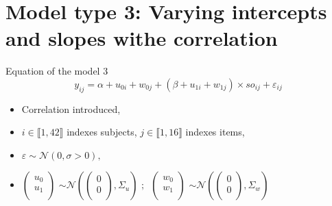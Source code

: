 \documentclass[unknownkeysallowed]{beamer}
\begin{document}
\section{Model type 3: Varying intercepts and slopes withe correlation}

\begin{frame}{Equation of the model 3}
{\[y_{ij}=\alpha + u_{0i} + w_{0j} + (\beta + u_{1i} + w_{1j})\times so_{ij}+\varepsilon_{ij}\]}

\medskip

 \begin{itemize}
        \item Correlation introduced,
        \item $i \in \llbracket1,42\rrbracket$ indexes subjects, $j \in \llbracket1,16\rrbracket$ indexes items,
        \item $\varepsilon \sim \mathcal{N}(0,\sigma>0),$
        \item $\begin{pmatrix}
        u_0 \\
        u_1 \\
        \end{pmatrix}$ $\sim \mathcal{N}\left(\begin{pmatrix}
        0 \\
        0 \\
        \end{pmatrix}, \Sigma_u\right) \text{ ; }$ $\begin{pmatrix}
        w_0 \\
        w_1 \\
        \end{pmatrix}$ $\sim \mathcal{N}\left(\begin{pmatrix}
        0 \\
        0 \\
        \end{pmatrix}, \Sigma_w\right)$
    \end{itemize}
\end{frame}
\end{document}
